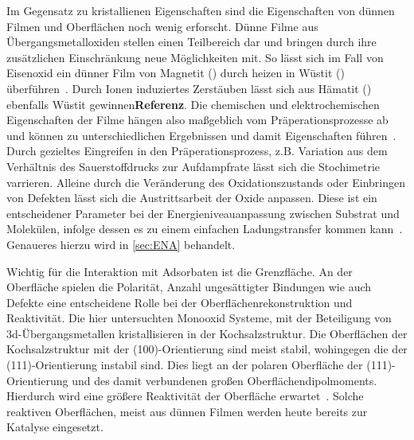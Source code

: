         Im Gegensatz zu kristallienen Eigenschaften sind die Eigenschaften von dünnen Filmen und Oberflächen noch wenig erforscht.
        Dünne Filme aus Übergangsmetalloxiden stellen einen Teilbereich dar und bringen durch ihre zusätzlichen Einschränkung neue Möglichkeiten mit.
        So lässt sich im Fall von Eisenoxid ein dünner Film von Magnetit () durch heizen in Wüstit () überführen~\cite{FeO_1}.
        Durch Ionen induziertes Zerstäuben lässt sich aus Hämatit () ebenfalls Wüstit gewinnen\textbf{Referenz}.
        Die chemischen und elektrochemischen Eigenschaften der Filme hängen also maßgeblich vom Präperationsprozesse ab und können zu unterschiedlichen Ergebnissen und damit Eigenschaften führen~\cite{Uni-Tübingen}.
        Durch gezieltes Eingreifen in den Präperationsprozess, z.B. Variation aus dem Verhältnis des Sauerstoffdrucks zur Aufdampfrate lässt sich die Stochimetrie varrieren.
        Alleine durch die Veränderung des Oxidationszustands oder Einbringen von Defekten lässt sich die Austrittsarbeit der Oxide anpassen.
        Diese ist ein entscheidener Parameter bei der Energieniveauanpassung zwischen Substrat und Molekülen, infolge dessen es zu einem einfachen Ladungstransfer kommen kann~\cite{IF_3}.
        Genaueres hierzu wird in \autoref{sec:ENA} behandelt.

        Wichtig für die Interaktion mit Adsorbaten ist die Grenzfläche.
        An der Oberfläche spielen die Polarität, Anzahl ungesättigter Bindungen wie auch Defekte eine entscheidene Rolle bei der Oberflächenrekonstruktion und Reaktivität.
        Die hier untersuchten Monooxid Systeme, mit der Beteiligung von 3d-Übergangsmetallen kristallisieren in der Kochsalzstruktur.
        Die Oberflächen der Kochsalzstruktur mit der (100)-Orientierung sind meist stabil, wohingegen die der (111)-Orientierung instabil sind.
        Dies liegt an der polaren Oberfläche der (111)-Orientierung und des damit verbundenen großen Oberflächendipolmoments.
        Hierdurch wird eine größere Reaktivität der Oberfläche erwartet~\cite{Cappus et al. - 1993 - Hydroxyl groups on oxide surfaces NiO(100), NiO(1.pdf}.
        Solche reaktiven Oberflächen, meist aus dünnen Filmen werden heute bereits zur Katalyse eingesetzt.

